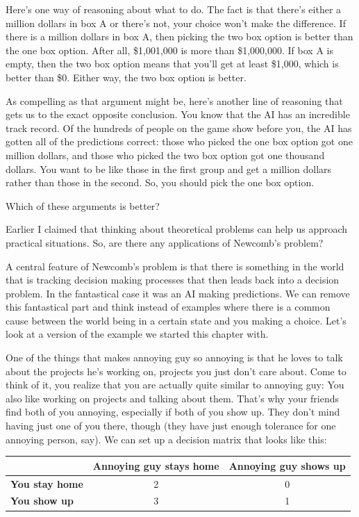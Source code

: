 \documentclass[]{tufte-book}
\begin{document}
Here's one way of reasoning about what to do. The fact is that there's either a million dollars in box A or there's not, your choice won't make the difference. If there is a million dollars in box A, then picking the two box option is better than the one box option. After all, \$1,001,000 is more than \$1,000,000. If box A is empty, then the two box option means that you'll get at least \$1,000, which is better than \$0. Either way, the two box option is better.

As compelling as that argument might be, here's another line of reasoning that gets us to the exact opposite conclusion. You know that the AI has an incredible track record. Of the hundreds of people on the game show before you, the AI has gotten all of the predictions correct: those who picked the one box option got one million dollars, and those who picked the two box option got one thousand dollars. You want to be like those in the first group and get a million dollars rather than those in the second. So, you should pick the one box option.

Which of these arguments is better?

Earlier I claimed that thinking about theoretical problems can help us approach practical situations. So, are there any applications of Newcomb's problem?

A central feature of Newcomb's problem is that there is something in the world that is tracking decision making processes that then leads back into a decision problem. In the fantastical case it was an AI making predictions. We can remove this fantastical part and think instead of examples where there is a common cause between the world being in a certain state and you making a choice. Let's look at a version of the example we started this chapter with.

One of the things that makes annoying guy so annoying is that he loves to talk about the projects he's working on, projects you just don't care about. Come to think of it, you realize that you are actually quite similar to annoying guy: You also like working on projects and talking about them. That's why your friends find both of you annoying, especially if both of you show up. They don't mind having just one of you there, though (they have just enough tolerance for one annoying person, say). We can set up a decision matrix that looks like this:

\begin{longtable}[]{@{}lcc@{}}
\toprule
& Annoying guy stays home & Annoying guy shows up\tabularnewline
\midrule
\endhead
\textbf{You stay home} & 2 & 0\tabularnewline
\textbf{You show up} & 3 & 1\tabularnewline
\bottomrule
\end{longtable}
\end{document}
